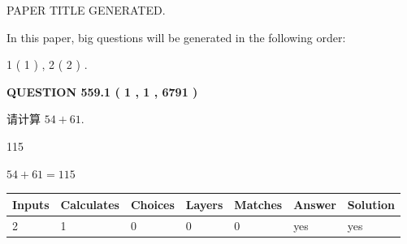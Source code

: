 \documentclass{ctexart}
\begin{document}
   
 \vspace{0.2in}
 
 
 
 
   
   
 PAPER TITLE GENERATED.
   
   
   
\vspace{0.2in}
   
In this paper, big questions will be generated in the following order: 
   
   
   1 ( 1 )
 ,
   2 ( 2 )
 .
  
\vspace{0.2in}
  
{\textbf{\Large{QUESTION
559.1 
 ( 1 , 1 , 6791 )
}}}
  
  
 
请计算 $ %
54 +  %
61 $.
 
 
 
\noindent{}
 
 

115
 
 
\noindent{}
 
 

 
 
 
\noindent{}
 
 

$ %
54 +  %
61=   %
115$
 
 
\noindent{}
 
 

 
   
   
   
   
\noindent\begin{tabular}{|l|l|l|l|l|l|l|}
 \hline
Inputs & Calculates & Choices & Layers & Matches & Answer & Solution \\ \hline
 2  & 
 1  & 
 0
  & 
 0  & 
 0  & 
  yes & 
  yes 
  \\ \hline
 \end{tabular}
   
   
   
   
\noindent{}
   
   
  
\end{document}
